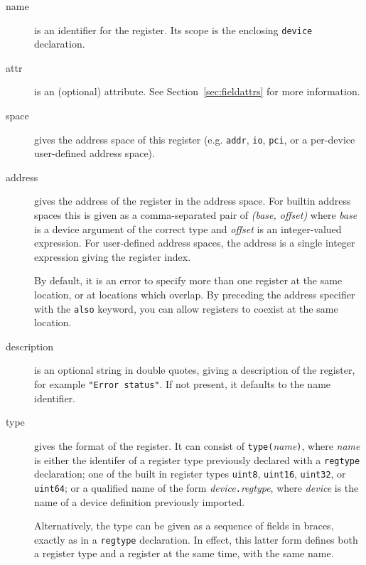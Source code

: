 \documentclass[a4paper,11pt,twoside]{report}
\begin{document}
\begin{description}

\item[name] is an identifier for the register.  Its scope is the
  enclosing \texttt{device} declaration. 

\item[attr] is an (optional) attribute.  See
  Section~\ref{sec:fieldattrs} for more information.

\item[space] gives the address space of this register
  (e.g. \texttt{addr}, \texttt{io}, \texttt{pci}, or a per-device
  user-defined address space).

\item[address] gives the address of the register in the address
  space.  For builtin address spaces this is given as a
  comma-separated pair of \textit{(base, offset)} where \textit{base}
  is a device argument of the correct type and \textit{offset} is an
  integer-valued \Mac expression.   For user-defined address spaces,
  the address is a single \Mac integer expression giving the register
  index.  

  By default, it is an error to specify more than one
  register at the same location, or at locations which overlap.  By
  preceding the address specifier with the \texttt{also} keyword, you
  can allow registers to coexist at the same location. 

\item[description] is an optional string in double quotes, giving a
  description of the register, for example \texttt{"Error status"}. 
  If not present, it defaults to the name identifier.  

\item[type] gives the format of the register.  It can consist of
  \texttt{type(}\textit{name}\texttt{)}, where \textit{name} is either
  the identifer of a register type previously declared with a
  \texttt{regtype} declaration; one of the built in register
  types \texttt{uint8}, \texttt{uint16}, \texttt{uint32}, or
  \texttt{uint64}; or a qualified name of the form
  \textit{device}\texttt{.}\textit{regtype}, where \textit{device} is
  the name of a device definition previously imported. 

  Alternatively, the type can be given as a sequence of fields in
  braces, exactly as in a \texttt{regtype} declaration.  In effect,
  this latter form defines both a register type and a register at the
  same time, with the same name. 

\end{description}
\end{document}

